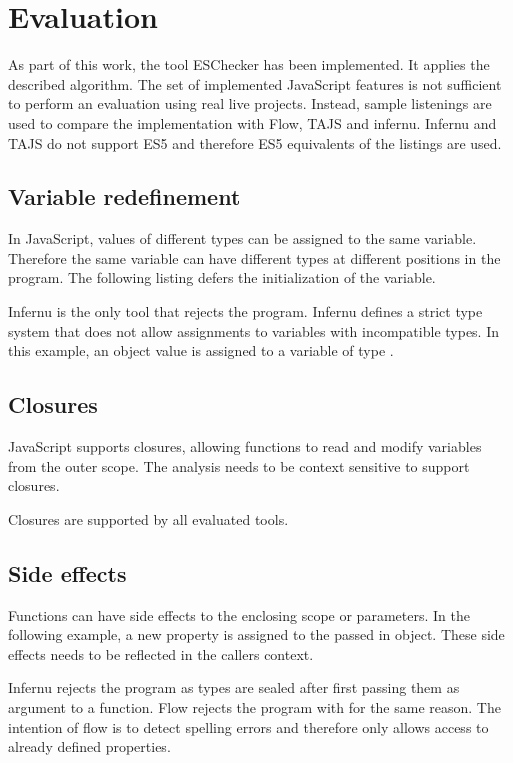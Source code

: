 \section{Evaluation}
As part of this work, the tool ESChecker has been implemented. It applies the described algorithm. The set of implemented JavaScript features is not sufficient to perform an evaluation using real live projects. Instead, sample listenings are used to compare the implementation with Flow, TAJS and infernu. Infernu and TAJS do not support ES5 and therefore ES5 equivalents of the listings are used.

\subsection{Variable redefinement}
In JavaScript, values of different types can be assigned to the same variable. Therefore the same variable can have different types at different positions in the program. The following listing defers the initialization of the variable.


Infernu is the only tool that rejects the program. Infernu defines a strict type system that does not allow assignments to variables with incompatible types. In this example, an object value is assigned to a variable of type . 

\subsection{Closures}
JavaScript supports closures, allowing functions to read and modify variables from the outer scope. The analysis needs to be context sensitive to support closures. 


Closures are supported by all evaluated tools.

\subsection{Side effects}
Functions can have side effects to the enclosing scope or parameters. In the following example, a new property is assigned to the passed in object. These side effects needs to be reflected in the callers context.


Infernu rejects the program as types are sealed after first passing them as argument to a function. Flow rejects the program with for the same reason. The intention of flow is to detect spelling errors and therefore only allows access to already defined properties. 


